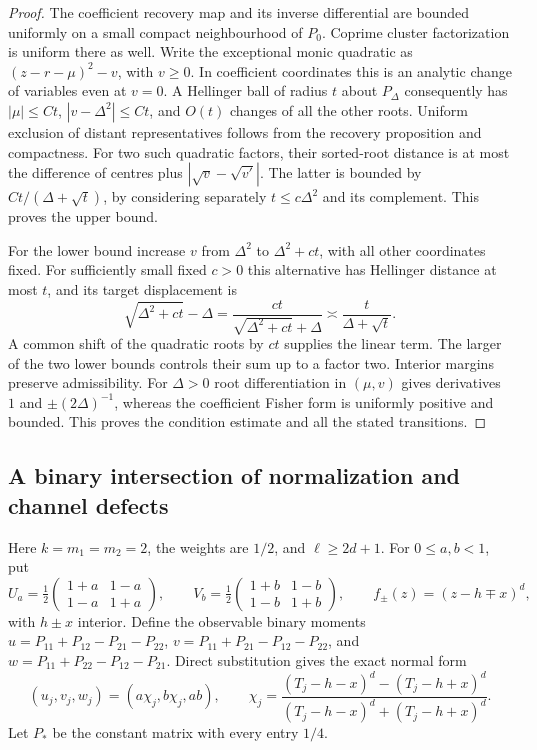 \begin{proof}
The coefficient recovery map and its inverse differential are bounded
uniformly on a small compact neighbourhood of $P_0$. Coprime cluster
factorization is uniform there as well. Write the exceptional monic
quadratic as $(z-r-\mu)^2-v$, with $v\ge0$. In coefficient coordinates
this is an analytic change of variables even at $v=0$.
A Hellinger ball of radius $t$ about $P_\Delta$ consequently has
$|\mu|\le Ct$, $|v-\Delta^2|\le Ct$, and $O(t)$ changes of all the
other roots. Uniform exclusion of distant representatives follows
from the recovery proposition and compactness. For two such quadratic
factors, their sorted-root distance is at most the difference of
centres plus $|\sqrt v-\sqrt{v'}|$. The latter is bounded by
$C t/(\Delta+\sqrt t)$, by considering separately
$t\le c\Delta^2$ and its complement. This proves the upper bound.

For the lower bound increase $v$ from $\Delta^2$ to
$\Delta^2+ct$, with all other coordinates fixed. For sufficiently
small fixed $c>0$ this alternative has Hellinger distance at most $t$,
and its target displacement is
\[
 \sqrt{\Delta^2+ct}-\Delta
       =\frac{ct}{\sqrt{\Delta^2+ct}+\Delta}
       \asymp\frac{t}{\Delta+\sqrt t}.
\]
A common shift of the quadratic roots by $ct$ supplies the linear
term. The larger of the two lower bounds controls their sum up to a
factor two. Interior margins preserve admissibility. For $\Delta>0$
root differentiation in $(\mu,v)$ gives derivatives $1$ and
$\pm(2\Delta)^{-1}$, whereas the coefficient Fisher form is uniformly
positive and bounded. This proves the condition estimate and all the
stated transitions.
\end{proof}

\subsection{A binary intersection of normalization and channel defects}
Here $k=m_1=m_2=2$, the weights are $1/2$, and $\ell\ge2d+1$.
For $0\le a,b<1$, put
\[
 U_a=\tfrac12\begin{pmatrix}1+a&1-a\\1-a&1+a\end{pmatrix},\qquad
 V_b=\tfrac12\begin{pmatrix}1+b&1-b\\1-b&1+b\end{pmatrix},
 \qquad f_\pm(z)=(z-h\mp x)^d,
\]
with $h\pm x$ interior. Define the observable binary moments
$u=P_{11}+P_{12}-P_{21}-P_{22}$,
$v=P_{11}+P_{21}-P_{12}-P_{22}$, and
$w=P_{11}+P_{22}-P_{12}-P_{21}$. Direct substitution gives the exact
normal form
\begin{equation}\label{eq:binary-normal-form}
 (u_j,v_j,w_j)=(a\chi_j,b\chi_j,ab),\qquad
 \chi_j=\frac{(T_j-h-x)^d-(T_j-h+x)^d}
              {(T_j-h-x)^d+(T_j-h+x)^d}.
\end{equation}
Let $P_*$ be the constant matrix with every entry $1/4$.

